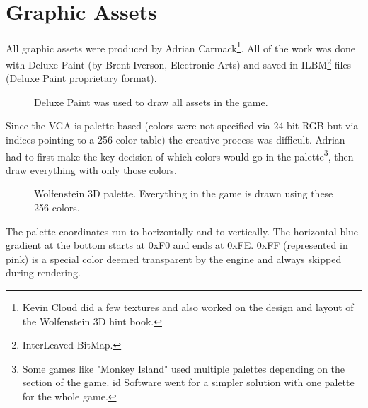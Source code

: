 \documentclass[book.tex]{subfiles}
\begin{document}
  \\
\vspace{-5pt}  
\par
\vspace{5pt}

 






\section{Graphic Assets}

All graphic assets were produced by Adrian Carmack\footnote{Kevin Cloud did a few textures and also worked on the design and layout of the Wolfenstein 3D hint book.}. All of the work was done with Deluxe Paint (by Brent Iverson, Electronic Arts) and saved in ILBM\footnote{InterLeaved BitMap.} files (Deluxe Paint proprietary format). 

\begin{figure}[H]
  \centering
 \caption{Deluxe Paint was used to draw all assets in the game.}
\end{figure}


\par
Since the VGA is palette-based (colors were not specified via 24-bit RGB but via indices pointing to a 256 color table) the creative process was difficult. Adrian had to first make the key decision of which colors would go in the palette\footnote{Some games like "Monkey Island" used multiple palettes depending on the section of the game. id Software went for a simpler solution with one palette for the whole game.}, then draw everything with only those colors.\\
\begin{figure}[H]
  \centering
{}
 \caption{Wolfenstein 3D palette. Everything in the game is drawn using these 256 colors.}
\end{figure}
The palette coordinates run  to  horizontally and  to  vertically. The horizontal blue gradient at the bottom starts at 0xF0 and ends at 0xFE. 0xFF (represented in pink) is a special color deemed transparent by the engine and always skipped during rendering.\\
\par
\end{document}
